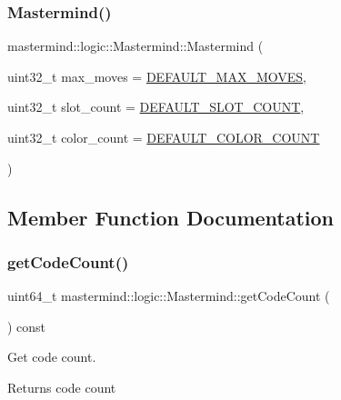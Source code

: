 \subsubsection{\texorpdfstring{Mastermind()}{Mastermind()}}
{\footnotesize\ttfamily mastermind\+::logic\+::\+Mastermind\+::\+Mastermind (\begin{DoxyParamCaption}\item[{uint32\+\_\+t}]{max\+\_\+moves = {\ttfamily \hyperlink{classmastermind_1_1logic_1_1_mastermind_a1b389e8f4829939f8fd49e093cb9868b}{D\+E\+F\+A\+U\+L\+T\+\_\+\+M\+A\+X\+\_\+\+M\+O\+V\+ES}},  }\item[{uint32\+\_\+t}]{slot\+\_\+count = {\ttfamily \hyperlink{classmastermind_1_1logic_1_1_mastermind_a27d7dbfa1b75744f4b8378e7faaec0af}{D\+E\+F\+A\+U\+L\+T\+\_\+\+S\+L\+O\+T\+\_\+\+C\+O\+U\+NT}},  }\item[{uint32\+\_\+t}]{color\+\_\+count = {\ttfamily \hyperlink{classmastermind_1_1logic_1_1_mastermind_a090907ffd34339289c533fada5bd05c6}{D\+E\+F\+A\+U\+L\+T\+\_\+\+C\+O\+L\+O\+R\+\_\+\+C\+O\+U\+NT}} }\end{DoxyParamCaption})}



\subsection{Member Function Documentation}
\hypertarget{classmastermind_1_1logic_1_1_mastermind_a75472536b4800a58cfcc47cbe07b02cf}{}\label{classmastermind_1_1logic_1_1_mastermind_a75472536b4800a58cfcc47cbe07b02cf} 
\subsubsection{\texorpdfstring{get\+Code\+Count()}{getCodeCount()}}
{\footnotesize\ttfamily uint64\+\_\+t mastermind\+::logic\+::\+Mastermind\+::get\+Code\+Count (\begin{DoxyParamCaption}{ }\end{DoxyParamCaption}) const}



Get code count. 

\begin{DoxyReturn}{Returns}
code count 
\end{DoxyReturn}
\hypertarget{classmastermind_1_1logic_1_1_mastermind_ab24668a2fa062cd89a4bd3878b8beef8}{}\label{classmastermind_1_1logic_1_1_mastermind_ab24668a2fa062cd89a4bd3878b8beef8} 
